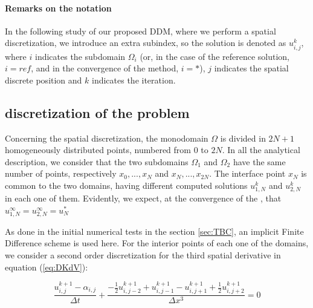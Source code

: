 \paragraph{Remarks on the notation}


\indent {} In the following study of our proposed DDM, where we perform a spatial discretization, we introduce an extra subindex, so the solution is denoted as $u_{i,j}^{k}$, where $i$ indicates the subdomain $\Omega_i$ (or, in the case of the reference solution, $i = ref$, and in the convergence of the method, $i = *$), $j$ indicates the spatial discrete position and $k$ indicates the iteration.


\subsection{ discretization of the problem}

\indent Concerning the spatial discretization, the monodomain $\Omega$ is divided in $2N + 1$ homogeneously distributed points, numbered from $0$ to $2N$. In all the analytical description, we consider that the two subdomains $\Omega_1$ and $\Omega_2$ have the same number of points, respectively $x_0,...,x_N$ and $x_N,...,x_{2N}$. The interface point $x_N$ is common to the two domains, having different computed solutions $u_{1,N}^k$ and $u_{2,N}^k$ in each one of them. Evidently, we expect, at the convergence of the , that $u_{1,N}^\infty = u_{2,N}^\infty = u_N^*$

\indent As done in the initial numerical tests in the section \ref{sec:TBC}, an implicit Finite Difference scheme is used here. For the interior points of each one of the domains, we consider a second order discretization for the third spatial derivative in equation (\ref{eq:DKdV}):

\begin{equation}
    \label{eq:FDdiscretization}
    \frac{u^{k+1}_{i,j} - \alpha_{i,j}}{\Delta t} + \frac{-\frac{1}{2}u_{i,j-2}^{k+1} + u_{i,j-1}^{k+1} - u_{i,j+1}^{k+1} + \frac{1}{2}u_{i,j+2}^{k+1} }{\Delta x ^3} = 0
\end{equation}

